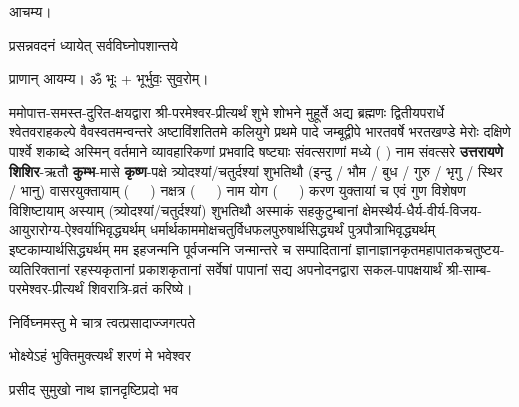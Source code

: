 
\setlength{\parindent}{0pt}

आचम्य।

{प्रसन्नवदनं ध्यायेत् सर्वविघ्नोपशान्तये}
 
प्राणान्  आयम्य।  ॐ भूः + भूर्भुवः॒ सुव॒रोम्।


ममोपात्त-समस्त-दुरित-क्षयद्वारा श्री-परमेश्वर-प्रीत्यर्थं शुभे शोभने मुहूर्ते अद्य ब्रह्मणः
द्वितीयपरार्धे श्वेतवराहकल्पे वैवस्वतमन्वन्तरे अष्टाविंशतितमे कलियुगे प्रथमे पादे
जम्बूद्वीपे भारतवर्षे भरतखण्डे मेरोः दक्षिणे पार्श्वे शकाब्दे अस्मिन् वर्तमाने व्यावहारिकणां
 प्रभवादि षष्ट्याः संवत्सराणां मध्ये (	) नाम संवत्सरे \textbf{उत्तरायणे} 
\textbf{शिशिर}-ऋतौ  \textbf{कुम्भ}-मासे \textbf{कृष्ण}-पक्षे त्र्योदश्यां/चतुर्दश्यां शुभतिथौ
(इन्दु / भौम / बुध / गुरु / भृगु / स्थिर / भानु) वासरयुक्तायाम्
\mbox{(~~~)} नक्षत्र \mbox{(~~~)} नाम  योग  \mbox{(~~~)} करण युक्तायां च एवं गुण विशेषण विशिष्टायाम्
अस्याम् (त्र्योदश्यां/चतुर्दश्यां) शुभतिथौ 
अस्माकं सहकुटुम्बानां क्षेमस्थैर्य-धैर्य-वीर्य-विजय-आयुरारोग्य-ऐश्वर्याभिवृद्ध्यर्थम्
 धर्मार्थकाममोक्ष\-चतुर्विधफलपुरुषार्थसिद्ध्यर्थं पुत्रपौत्राभि\-वृद्ध्यर्थम् इष्टकाम्यार्थसिद्ध्यर्थम्
मम इहजन्मनि पूर्वजन्मनि जन्मान्तरे च सम्पादितानां ज्ञानाज्ञानकृतमहा\-पातकचतुष्टय-व्यतिरिक्तानां रहस्यकृतानां प्रकाशकृतानां सर्वेषां पापानां सद्य अपनोदनद्वारा सकल-पापक्षयार्थं श्री-साम्ब-परमेश्वर-प्रीत्यर्थं शिवरात्रि-व्रतं करिष्ये।

{निर्विघ्नमस्तु मे चात्र त्वत्प्रसादाज्जगत्पते}

{भोक्ष्येऽहं भुक्तिमुक्त्यर्थं शरणं मे भवेश्वर}


















{प्रसीद सुमुखो नाथ ज्ञानदृष्टिप्रदो भव}


\closesection

